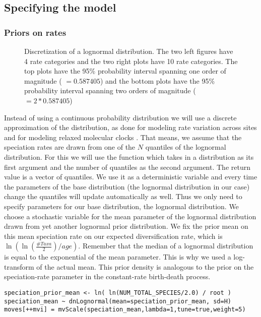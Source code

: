\subsection{Specifying the model}

\subsubsection{Priors on rates}
\begin{figure}[htbp!]
\centering
{}
\caption{\small Discretization of a lognormal distribution. The two left figures have 4 rate categories and the two right plots have 10 rate categories. The top plots have the 95\% probability interval spanning one order of magnitude ( $=0.587405$) and the bottom plots have the 95\% probability interval spanning two orders of magnitude ( $=2*0.587405$)}
\label{fig:BSBD_discretization}
\end{figure}
Instead of using a continuous probability distribution we will use a discrete approximation of the distribution, as done for modeling rate variation across sites \citep{Yang1994a} and for modeling relaxed molecular clocks \citep{Drummond2006}.
That means, we assume that the speciation rates are drawn from one of the $N$ quantiles of the lognormal distribution.
For this we will use the function  which takes in a distribution as its first argument and the number of quantiles as the second argument.
The return value is a vector of quantiles.
We use it as a deterministic variable and every time the parameters of the base distribution (\IE the lognormal distribution in our case) change the quantiles will update automatically as well.
Thus we only need to specify parameters for our base distribution, the lognormal distribution.
We choose a stochastic variable for the mean parameter of the lognormal distribution drawn from yet another lognormal prior distribution.
We fix the prior mean on this mean speciation rate on our expected diversification rate, which is $\ln( \ln(\frac{\#Taxa}{2})/age )$.
Remember that the median of a lognormal distribution is equal to the exponential of the mean parameter.
This is why we used a log-transform of the actual mean.
This prior density is analogous to the prior on the speciation-rate parameter in the constant-rate birth-death process.
{\tt \begin{snugshade*}
\begin{lstlisting}
speciation_prior_mean <- ln( ln(NUM_TOTAL_SPECIES/2.0) / root )
speciation_mean ~ dnLognormal(mean=speciation_prior_mean, sd=H)
moves[++mvi] = mvScale(speciation_mean,lambda=1,tune=true,weight=5)
\end{lstlisting}
\end{snugshade*}}
